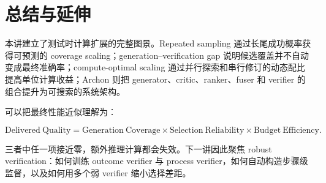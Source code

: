\section{总结与延伸}

本讲建立了测试时计算扩展的完整图景。Repeated sampling 通过长尾成功概率获得可预测的 coverage scaling；generation--verification gap 说明候选覆盖并不自动变成最终准确率；compute-optimal scaling 通过并行探索和串行修订的动态配比提高单位计算收益；Archon 则把 generator、critic、ranker、fuser 和 verifier 的组合提升为可搜索的系统架构。

可以把最终性能近似理解为：

$$
\mathrm{Delivered\ Quality}
=\mathrm{Generation\ Coverage}
\times\mathrm{Selection\ Reliability}
\times\mathrm{Budget\ Efficiency}.
$$

三者中任一项接近零，额外推理计算都会失效。下一讲因此聚焦 robust verification：如何训练 outcome verifier 与 process verifier，如何自动构造步骤级监督，以及如何用多个弱 verifier 缩小选择差距。


